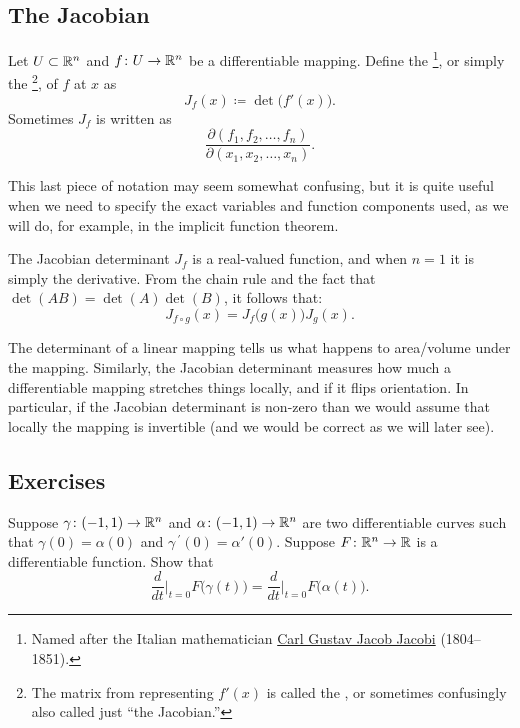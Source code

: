 \subsection{The Jacobian}

\begin{defn}
Let $U \subset {\mathbb{R}}^n$ and
$f \colon U \to {\mathbb{R}}^n$ be a differentiable mapping.  Define the
\emph{}%
\footnote{Named after the Italian mathematician
\href{https://en.wikipedia.org/wiki/Carl_Gustav_Jacob_Jacobi}{Carl Gustav Jacob Jacobi}
(1804--1851).},
or simply the
\emph{}%
\footnote{The matrix from  representing $f'(x)$
is called the
\emph{}, or sometimes confusingly also called just ``the
Jacobian.''},
of $f$ at $x$ as
\begin{equation*}
J_f(x) \coloneqq \det\bigl( f'(x) \bigr) .
\end{equation*}
Sometimes $J_f$ is written as
\begin{equation*}
\frac{\partial(f_1,f_2,\ldots,f_n)}{\partial(x_1,x_2,\ldots,x_n)} .
\end{equation*}
\end{defn}

This last piece of notation may seem somewhat confusing,
but it is quite useful when we need to specify
the exact variables and function components used,
as we will do, for example, in the implicit function theorem.

The Jacobian determinant $J_f$ is a real-valued function, and when $n=1$ it is simply the
derivative.
From the chain rule and the fact that $\det(AB) = \det(A)\det(B)$, it follows that:
\begin{equation*}
J_{f \circ g} (x) = J_f\bigl(g(x)\bigr) J_g(x) .
\end{equation*}

The determinant of a linear mapping tells us what happens to
area/volume under the mapping.
Similarly, the Jacobian determinant measures how much a differentiable mapping stretches
things locally, and if it flips orientation.  In particular, if the Jacobian
determinant
is non-zero than we would assume that locally the mapping is invertible (and
we would be correct as we will later see).

\subsection{Exercises}

\begin{exercise}
Suppose $\gamma \colon (-1,1) \to {\mathbb{R}}^n$ and
$\alpha \colon (-1,1) \to {\mathbb{R}}^n$ are two differentiable curves
such that $\gamma(0) = \alpha(0)$ and $\gamma^{\:\prime}(0) = \alpha'(0)$.
Suppose $F \colon {\mathbb{R}}^n \to {\mathbb{R}}$ is a differentiable function.  Show that
\begin{equation*}
\frac{d}{dt}\Big|_{t=0}
F\bigl(\gamma(t)\bigr)
=
\frac{d}{dt}\Big|_{t=0}
F\bigl(\alpha(t)\bigr)
.
\end{equation*}
\end{exercise}

